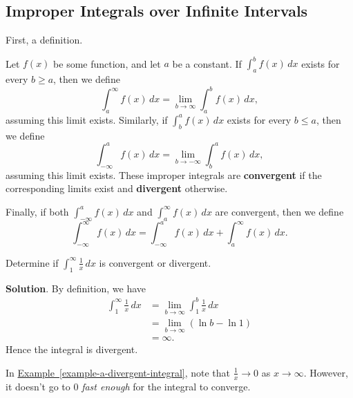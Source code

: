 \documentclass[10pt,]{book}
\newcommand{\terminology}[1]{\textbf{#1}}
\theoremstyle{ptxplainnotitle}
\theoremstyle{ptxplaintitle}
\theoremstyle{ptxplainnotitle}
\theoremstyle{ptxplaintitle}
\theoremstyle{ptxplainnotitle}
\theoremstyle{ptxplaintitle}
\theoremstyle{ptxdefinitionnotitle}
\theoremstyle{ptxdefinitiontitle}
\theoremstyle{ptxdefinitionnotitle}
\theoremstyle{ptxdefinitiontitle}
\theoremstyle{ptxdefinitionnotitle}
\theoremstyle{ptxdefinitiontitle}
\theoremstyle{ptxdefinitionnotitle}
\theoremstyle{ptxdefinitiontitle}
\theoremstyle{ptxdefinitionnotitle}
\theoremstyle{ptxdefinitiontitle}
\numberwithin{equation}{section}
\begin{document}
\subsection[{Improper Integrals over Infinite Intervals}]{Improper Integrals over Infinite Intervals}\label{subsection-improper-integrals-over-infinite-intervals}
\hypertarget{p-579}{}%
First, a definition.%
\begin{definition}\label{definition-type-1-improper-integral}
\hypertarget{p-580}{}%
Let \(f(x)\) be some function, and let \(a\) be a constant. If \(\int_{a}^{b}f(x)\,dx\) exists for every \(b\geq a\), then we define%
\begin{equation*}
\int_{a}^{\infty}f(x)\,dx = \lim_{b\to\infty}\int_{a}^{b}f(x)\,dx,
\end{equation*}
assuming this limit exists. Similarly, if \(\int_{b}^{a}f(x)\,dx\) exists for every \(b\leq a\), then we define%
\begin{equation*}
\int_{-\infty}^{a}f(x)\,dx = \lim_{b\to-\infty}\int_{b}^{a}f(x)\,dx,
\end{equation*}
assuming this limit exists. These improper integrals are \terminology{convergent} if the corresponding limits exist and \terminology{divergent} otherwise.%
\par
\hypertarget{p-581}{}%
Finally, if both \(\int_{-\infty}^{a}f(x)\,dx\) and \(\int_{a}^{\infty}f(x)\,dx\) are convergent, then we define%
\begin{equation*}
\int_{-\infty}^{\infty}f(x)\,dx = \int_{-\infty}^{a}f(x)\,dx + \int_{a}^{\infty}f(x)\,dx.
\end{equation*}
%
\end{definition}
\begin{example}\label{example-a-divergent-integral}
\hypertarget{p-582}{}%
Determine if \(\int_{1}^{\infty}\frac{1}{x}\,dx\) is convergent or divergent.%
\par\smallskip%
\noindent\textbf{Solution}.\hypertarget{solution-126}{}\quad%
\hypertarget{p-583}{}%
By definition, we have%
\begin{align*}
\int_{1}^{\infty}\frac{1}{x}\,dx & = \lim_{b\to\infty}\int_{1}^{b}\frac{1}{x}\,dx \\
& = \lim_{b\to\infty}(\ln b - \ln 1) \\
& = \infty. 
\end{align*}
Hence the integral is divergent.%
\end{example}
\hypertarget{p-584}{}%
In \hyperref[example-a-divergent-integral]{Example~\ref{example-a-divergent-integral}}, note that \(\frac{1}{x}\to0\) as \(x\to\infty\). However, it doesn't go to \(0\) \emph{fast enough} for the integral to converge.%
\end{document}
